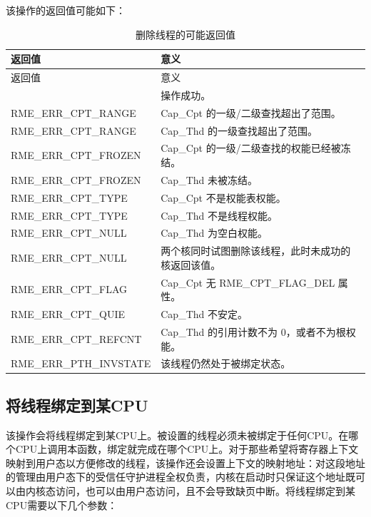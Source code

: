 该操作的返回值可能如下：

\begin{xltabular}{\textwidth}{@{}>{\hsize\raggedright\arraybackslash}X>{\hsize\raggedright\arraybackslash}X@{}}
\caption{删除线程的可能返回值}\label{tab:4-23-delete-thread-return-values}\\
\toprule
返回值 & 意义\tabularnewline
\endfirsthead
\toprule
返回值 & 意义\tabularnewline
\midrule
\endhead
\bottomrule
{} & 操作成功。\tabularnewline
    RME\_ERR\_CPT\_RANGE & Cap\_Cpt 的一级/二级查找超出了范围。\tabularnewline
    RME\_ERR\_CPT\_RANGE & Cap\_Thd 的一级查找超出了范围。\tabularnewline
    RME\_ERR\_CPT\_FROZEN & Cap\_Cpt 的一级/二级查找的权能已经被冻结。\tabularnewline
    RME\_ERR\_CPT\_FROZEN & Cap\_Thd 未被冻结。\tabularnewline
    RME\_ERR\_CPT\_TYPE & Cap\_Cpt 不是权能表权能。\tabularnewline
    RME\_ERR\_CPT\_TYPE & Cap\_Thd 不是线程权能。\tabularnewline
    RME\_ERR\_CPT\_NULL & Cap\_Thd 为空白权能。\tabularnewline
    RME\_ERR\_CPT\_NULL & 两个核同时试图删除该线程，此时未成功的核返回该值。\tabularnewline
    RME\_ERR\_CPT\_FLAG & Cap\_Cpt 无 RME\_CPT\_FLAG\_DEL 属性。\tabularnewline
    RME\_ERR\_CPT\_QUIE & Cap\_Thd 不安定。\tabularnewline
    RME\_ERR\_CPT\_REFCNT & Cap\_Thd 的引用计数不为 0，或者不为根权能。\tabularnewline
    RME\_ERR\_PTH\_INVSTATE & 该线程仍然处于被绑定状态。\tabularnewline
\end{xltabular}

\subsection{将线程绑定到某CPU}\label{subsec:4-bind-a-thread-to-a-cpu}

该操作会将线程绑定到某CPU上。被设置的线程必须未被绑定于任何CPU。在哪个CPU上调用本函数，绑定就完成在哪个CPU上。对于那些希望将寄存器上下文映射到用户态以方便修改的线程，该操作还会设置上下文的映射地址：对这段地址的管理由用户态下的受信任守护进程全权负责，内核在启动时只保证这个地址既可以由内核态访问，也可以由用户态访问，且不会导致缺页中断。将线程绑定到某CPU需要以下几个参数：

